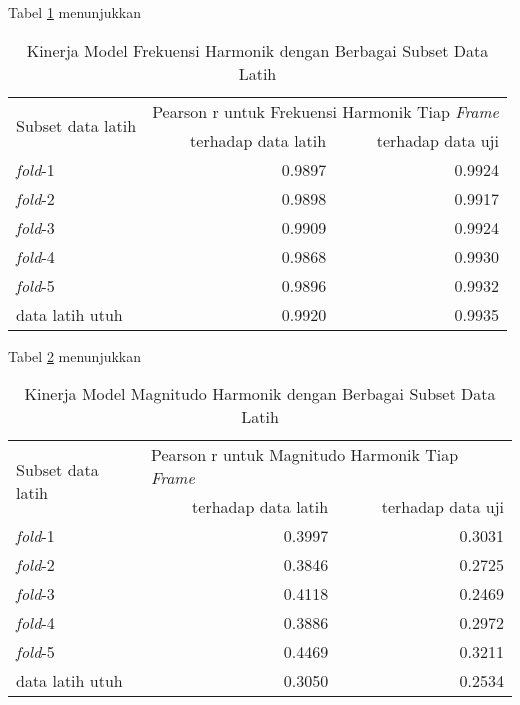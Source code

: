 Tabel \ref{tab-freq-model-subset-results} menunjukkan \blindtext
\begin{table}[h]
    \centering
    \caption{Kinerja Model Frekuensi Harmonik dengan Berbagai Subset Data Latih}\label{tab-freq-model-subset-results}
    \begin{tabular}{ |l|r|r| } 
     \hline
     \multirow{2}{*}{Subset data latih} & \multicolumn{2}{l|}{Pearson r untuk Frekuensi Harmonik Tiap \textit{Frame}} \\
     \cline{2-3}
     & terhadap data latih & terhadap data uji \\\hline
	\textit{fold}-1      &0.9897  &0.9924\\\hline
	\textit{fold}-2      &0.9898  &0.9917\\\hline
	\textit{fold}-3      &0.9909  &0.9924\\\hline
	\textit{fold}-4      &0.9868  &0.9930\\\hline
	\textit{fold}-5      &0.9896  &0.9932\\\hline
	data latih utuh      &0.9920  &0.9935\\\hline
    \end{tabular}
\end{table}

Tabel \ref{tab-mag-model-subset-results} menunjukkan \blindtext
\begin{table}[h]
    \centering
    \caption{Kinerja Model Magnitudo Harmonik dengan Berbagai Subset Data Latih}\label{tab-mag-model-subset-results}
    \begin{tabular}{ |l|r|r| } 
     \hline
     \multirow{2}{*}{Subset data latih} & \multicolumn{2}{l|}{Pearson r untuk Magnitudo Harmonik Tiap \textit{Frame}} \\
     \cline{2-3}
     & terhadap data latih & terhadap data uji \\\hline
	\textit{fold}-1      &0.3997  &0.3031\\\hline
	\textit{fold}-2      &0.3846  &0.2725\\\hline
	\textit{fold}-3      &0.4118  &0.2469\\\hline
	\textit{fold}-4      &0.3886  &0.2972\\\hline
	\textit{fold}-5      &0.4469  &0.3211\\\hline
	data latih utuh    	 &0.3050  &0.2534\\\hline
    \end{tabular}
\end{table}

